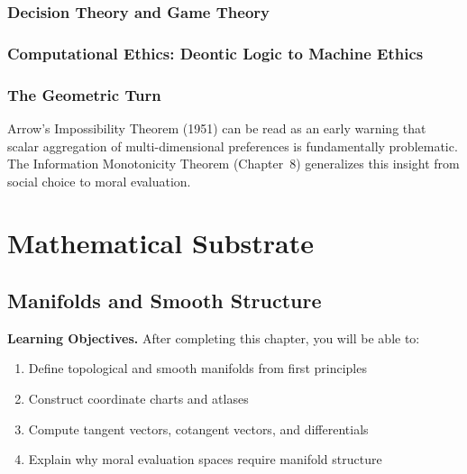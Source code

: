 \documentclass[12pt,letterpaper,twoside,openright]{book}
\theoremstyle{plain}
\theoremstyle{definition}
\theoremstyle{remark}
\begin{document}
\section{Decision Theory and Game Theory}

\section{Computational Ethics: Deontic Logic to Machine Ethics}

\section{The Geometric Turn}

\begin{historicalnote}
Arrow's Impossibility Theorem (1951) can be read as an early warning that scalar aggregation of multi-dimensional preferences is fundamentally problematic. The Information Monotonicity Theorem (Chapter~8) generalizes this insight from social choice to moral evaluation.
\end{historicalnote}


\part{Mathematical Substrate}
\label{part:substrate}

\chapter{Manifolds and Smooth Structure}
\label{ch:manifolds}

\begin{framed}
\noindent\textbf{Learning Objectives.} After completing this chapter, you will be able to:
\begin{enumerate}
    \item Define topological and smooth manifolds from first principles
    \item Construct coordinate charts and atlases
    \item Compute tangent vectors, cotangent vectors, and differentials
    \item Explain why moral evaluation spaces require manifold structure
\end{enumerate}
\end{framed}
\end{document}
